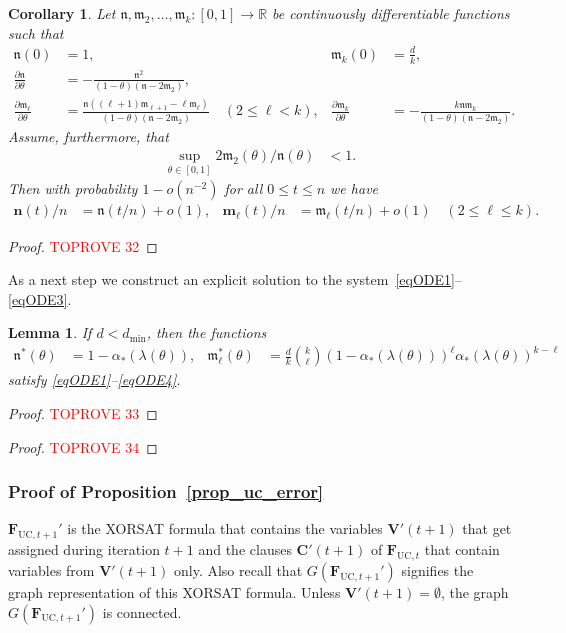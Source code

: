 \documentclass[10pt,reqno]{amsart}
\numberwithin{equation}{section}
\renewcommand{\vec}[1]{\boldsymbol{#1}}
\newcommand\dmin{d_{\mathrm{min}}}
\newcommand{\FUC}[1]{\PHI_{\mathrm{UC},{#1}}}
\newcommand\PHI{\vec F}
\newcommand\fm{\mathfrak m}
\newcommand\fn{\mathfrak n}
\newcommand\vC{\vec C}
\newcommand\vV{\vec V}
\newcommand\vm{\vec m}
\newcommand\vn{\vec n}
\newcommand\RR{\mathbb{R}}
\newcommand\Prop{Proposition}
\newtheorem{lemma}[definition]{Lemma}
\newtheorem{corollary}[definition]{Corollary}
\begin{document}
\begin{corollary}\label{cor_ODE}
	Let $\fn,\fm_2,\ldots,\fm_k:[0,1]\to\RR$ be continuously differentiable functions such that
	\begin{align}\label{eqODE1}
		\fn(0)&=1,&\fm_k(0)&=\frac dk,\\
		\frac{\partial\fn}{\partial\theta}&=-\frac{\fn^2}{(1-\theta)(\fn-2\fm_2)},\label{eqODE2}\\
		\frac{\partial\fm_\ell}{\partial\theta}&=\frac{\fn((\ell+1)\fm_{\ell+1}-\ell\fm_\ell)}{(1-\theta)(\fn-2\fm_2)}\quad(2\leq\ell<k),&
		\frac{\partial\fm_k}{\partial\theta}&=-\frac{k\fn\fm_k}{(1-\theta)(\fn-2\fm_2)}.\label{eqODE3}
	\end{align}
	Assume, furthermore, that
	\begin{align}\label{eqODE4}
		\sup_{\theta\in[0,1]}2\fm_2(\theta)/\fn(\theta)&<1.
	\end{align}
	Then with probability $1-o(n^{-2})$ for all $0\leq t\leq n$ we have
	\begin{align*}
		\vn(t)/n&=\fn(t/n)+o(1),& \vm_\ell(t)/n&=\fm_\ell(t/n)+o(1)\quad(2\leq\ell\leq k).
	\end{align*}
\end{corollary}
\begin{proof}\textcolor{red}{TOPROVE 32}\end{proof}

As a next step we construct an explicit solution to the system~\eqref{eqODE1}--\eqref{eqODE3}.

\begin{lemma}\label{lem_ODE}
	If $d<\dmin$, then the functions
	\begin{align}\label{eq_lem_ODE}
		\fn^*(\theta)&=1-\alpha_*(\lambda(\theta)),&
		\fm^*_\ell(\theta)&=\frac dk\binom{k}\ell(1-\alpha_*(\lambda(\theta)))^\ell\alpha_*(\lambda(\theta))^{k-\ell}
	\end{align}
	satisfy \eqref{eqODE1}--\eqref{eqODE4}.
\end{lemma}
\begin{proof}\textcolor{red}{TOPROVE 33}\end{proof}



\begin{proof}\textcolor{red}{TOPROVE 34}\end{proof}

\subsubsection{Proof of \Prop~\ref{prop_uc_error}}\label{sec_prop_uc_error}
$\FUC{t+1}'$ is the XORSAT formula that contains the variables $\vV'(t+1)$ that get assigned during iteration $t+1$ and the clauses $\vC'(t+1)$ of $\FUC{t}$ that contain variables from $\vV'(t+1)$ only.
Also recall that $G(\FUC{t+1}')$ signifies the graph representation of this XORSAT formula.
Unless $\vV'(t+1)=\emptyset$, the graph $G(\FUC{t+1}')$ is connected.
\end{document}
